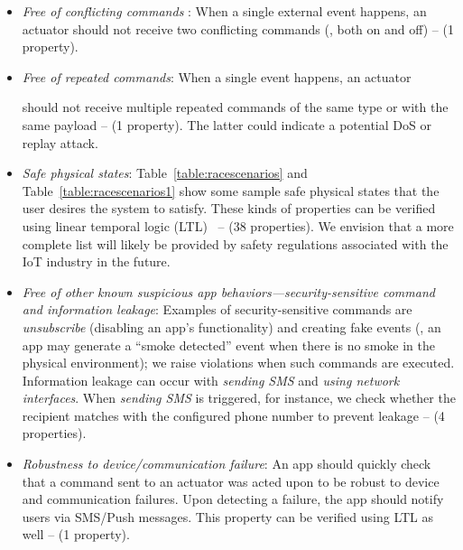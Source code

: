 \begin{itemize}
\item {\em Free of conflicting commands} {\color{black}\cite{Newcomb:2017:ICI:3133850.3133860}}: When a single external event happens,
an actuator {\color{black}should not receive} two conflicting commands (\eg, both on and off) -- (1 property).

\item {\em {\color{black} Free of} repeated commands}: When a single event happens,
an actuator {\color{black}should not receive multiple repeated commands of the same type or with the same payload -- (1 property).
The latter could indicate a potential DoS or replay attack.

}

\item {\em {\color{black}Safe} physical states}:
Table~\ref{table:racescenarios} and Table~\ref{table:racescenarios1} show some sample {\color{black}safe physical} states that the user desires the system to satisfy.
These kinds of properties can be verified using linear temporal logic (LTL)~\cite{Baier:modelchecking}
-- (38 properties).
We envision that a more complete list will likely be provided by safety regulations associated with the IoT industry in the future.

\item {\em {\color{black} Free of} other known suspicious app behaviors---security-sensitive command and information leakage}:
Examples of security-sensitive commands are \textit{unsubscribe} (disabling an app's functionality) {\color{black} and creating fake events (\eg, an app may generate a ``smoke detected'' event when there is no smoke in the physical environment); we raise violations when such commands are executed.}
Information leakage can occur with \textit{sending SMS} and \textit{using network interfaces}.
When \textit{sending SMS} is triggered, for instance,
we check whether the recipient matches with the configured phone number to prevent leakage -- (4 properties).

\item {\em Robustness to device/communication failure}: An app should quickly check
that a command sent to an actuator was acted upon to be robust to device and communication
failures. Upon detecting a failure, the app should notify users via SMS/Push messages.
This property can be verified using LTL as well -- (1 property).
\end{itemize}

